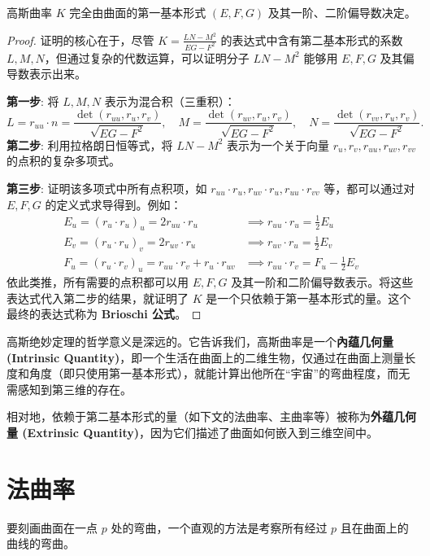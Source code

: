 \documentclass[lang=cn,10pt,thmcnt=section]{elegantbook}
\begin{document}
\begin{theorem}
    高斯曲率 $K$ 完全由曲面的第一基本形式 $(E,F,G)$ 及其一阶、二阶偏导数决定。
\end{theorem}
\begin{proof}
    证明的核心在于，尽管 $K=\frac{LN-M^2}{EG-F^2}$ 的表达式中含有第二基本形式的系数 $L,M,N$，但通过复杂的代数运算，可以证明分子 $LN-M^2$ 能够用 $E,F,G$ 及其偏导数表示出来。
    
    \textbf{第一步}: 将 $L,M,N$ 表示为混合积（三重积）：
    \[
    L = r_{uu} \cdot n = \frac{\det(r_{uu}, r_u, r_v)}{\sqrt{EG-F^2}}, \quad
    M = \frac{\det(r_{uv}, r_u, r_v)}{\sqrt{EG-F^2}}, \quad
    N = \frac{\det(r_{vv}, r_u, r_v)}{\sqrt{EG-F^2}}.
    \]
    \textbf{第二步}: 利用拉格朗日恒等式，将 $LN-M^2$ 表示为一个关于向量 $r_u, r_v, r_{uu}, r_{uv}, r_{vv}$ 的点积的复杂多项式。
    
    \textbf{第三步}: 证明该多项式中所有点积项，如 $r_{uu}\cdot r_u, r_{uv}\cdot r_u, r_{uu}\cdot r_{vv}$ 等，都可以通过对 $E,F,G$ 的定义式求导得到。例如：
    \begin{align*}
        E_u = (r_u \cdot r_u)_u = 2 r_{uu} \cdot r_u &\implies r_{uu} \cdot r_u = \frac{1}{2}E_u \\
        E_v = (r_u \cdot r_u)_v = 2 r_{uv} \cdot r_u &\implies r_{uv} \cdot r_u = \frac{1}{2}E_v \\
        F_u = (r_u \cdot r_v)_u = r_{uu} \cdot r_v + r_u \cdot r_{uv} &\implies r_{uu} \cdot r_v = F_u - \frac{1}{2}E_v
    \end{align*}
    依此类推，所有需要的点积都可以用 $E,F,G$ 及其一阶和二阶偏导数表示。将这些表达式代入第二步的结果，就证明了 $K$ 是一个只依赖于第一基本形式的量。这个最终的表达式称为 \textbf{Brioschi 公式}。
\end{proof}

\begin{definition}[內蕴与外蕴几何量]
    高斯绝妙定理的哲学意义是深远的。它告诉我们，高斯曲率是一个\textbf{內蕴几何量 (Intrinsic Quantity)}，即一个生活在曲面上的二维生物，仅通过在曲面上测量长度和角度（即只使用第一基本形式），就能计算出他所在“宇宙”的弯曲程度，而无需感知到第三维的存在。
    
    相对地，依赖于第二基本形式的量（如下文的法曲率、主曲率等）被称为\textbf{外蕴几何量 (Extrinsic Quantity)}，因为它们描述了曲面如何嵌入到三维空间中。
\end{definition}
\section{法曲率}
要刻画曲面在一点 $p$ 处的弯曲，一个直观的方法是考察所有经过 $p$ 且在曲面上的曲线的弯曲。
\end{document}
